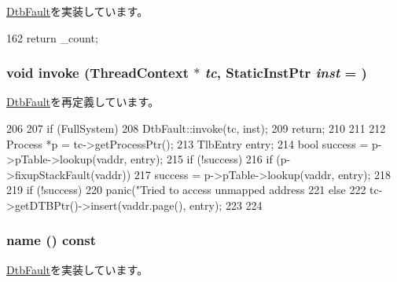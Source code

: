 \hyperlink{classAlphaISA_1_1DtbFault_a4b643982263b390349238a6711216763}{DtbFault}を実装しています。


\begin{DoxyCode}
162 {return _count;}
\end{DoxyCode}
\hypertarget{classAlphaISA_1_1NDtbMissFault_a2bd783b42262278d41157d428e1f8d6f}{
\subsubsection[{invoke}]{\setlength{\rightskip}{0pt plus 5cm}void invoke ({\bf ThreadContext} $\ast$ {\em tc}, \/  {\bf StaticInstPtr} {\em inst} = {})}}
\label{classAlphaISA_1_1NDtbMissFault_a2bd783b42262278d41157d428e1f8d6f}


\hyperlink{classAlphaISA_1_1DtbFault_a2bd783b42262278d41157d428e1f8d6f}{DtbFault}を再定義しています。


\begin{DoxyCode}
206 {
207     if (FullSystem) {
208         DtbFault::invoke(tc, inst);
209         return;
210     }
211 
212     Process *p = tc->getProcessPtr();
213     TlbEntry entry;
214     bool success = p->pTable->lookup(vaddr, entry);
215     if (!success) {
216         if (p->fixupStackFault(vaddr))
217             success = p->pTable->lookup(vaddr, entry);
218     }
219     if (!success) {
220         panic("Tried to access unmapped address %
221     } else {
222         tc->getDTBPtr()->insert(vaddr.page(), entry);
223     }
224 }
\end{DoxyCode}
\hypertarget{classAlphaISA_1_1NDtbMissFault_a73adb23259baf912a81683a9790a303f}{
\subsubsection[{name}]{ name () const}}
\label{classAlphaISA_1_1NDtbMissFault_a73adb23259baf912a81683a9790a303f}


\hyperlink{classAlphaISA_1_1DtbFault_a09ac100f5ad40cf1726c4e60925c2522}{DtbFault}を実装しています。


